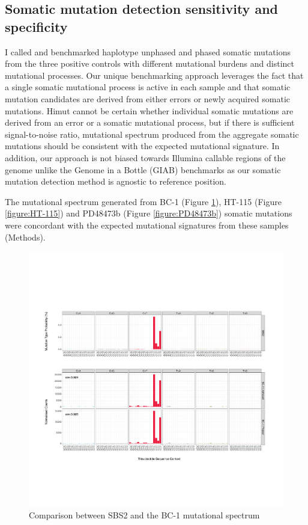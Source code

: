 \subsection{Somatic mutation detection sensitivity and specificity}

I called and benchmarked haplotype unphased and phased somatic mutations from the three positive controls with different mutational burdens and distinct mutational processes. Our unique benchmarking approach leverages the fact that a single somatic mutational process is active in each sample and that somatic mutation candidates are derived from either errors or newly acquired somatic mutations. Himut cannot be certain whether individual somatic mutations are derived from an error or a somatic mutational process, but if there is sufficient signal-to-noise ratio, mutational spectrum produced from the aggregate somatic mutations should be consistent with the expected mutational signature. In addition, our approach is not biased towards Illumina callable regions of the genome unlike the Genome in a Bottle (GIAB) benchmarks \cite{Zook2014-et} as our somatic mutation detection method is agnostic to reference position. 

The mutational spectrum generated from BC-1 (Figure \ref{figure:BC-1}), HT-115 (Figure \ref{figure:HT-115}) and PD48473b (Figure \ref{figure:PD48473b}) somatic mutations were concordant with the expected mutational signatures from these samples (Methods). 

\begin{figure}[htbp!]
\caption{Comparison between SBS2 and the BC-1 mutational spectrum}
\label{figure:BC-1}
\includegraphics[width=\textwidth]{Vector/hg19.SBS2.BC-1.pdf}
\end{figure}

